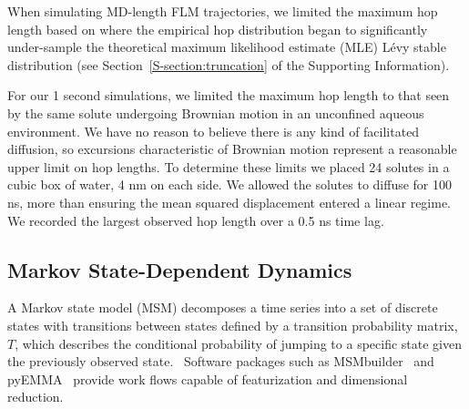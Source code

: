 \documentclass{article}
\begin{document}


  When simulating MD-length FLM trajectories, we limited the maximum hop length based on where
  the empirical hop distribution began to significantly under-sample the theoretical
  maximum likelihood estimate (MLE) L\'evy stable distribution (see 
  Section~\ref{S-section:truncation} of the Supporting Information).

  For our 1 second simulations, we limited the maximum hop length to that seen by
  the same solute undergoing Brownian motion in an unconfined aqueous environment. 
  We have no reason to believe there is any kind of facilitated diffusion, so 
  excursions characteristic of Brownian motion represent a reasonable upper limit
  on hop lengths. To determine these limits we placed 24 solutes in a cubic box of 
  water, 4 nm on each side. We allowed the solutes to diffuse for 100 ns, more than
  ensuring the mean squared displacement entered a linear regime. We recorded the largest
  observed hop length over a 0.5 ns time lag. 

  \subsection{Markov State-Dependent Dynamics}\label{method:MSMs}  

  A Markov state model (MSM) decomposes a time series into a set of discrete states
  with transitions between states defined by a transition probability matrix, $T$,
  which describes the conditional probability of jumping to a specific state given
  the previously observed state.~\cite{pande_everything_2010,wehmeyer_introduction_2018}
  Software packages such as MSMbuilder~\cite{beauchamp_msmbuilder2:_2011} and 
  pyEMMA~\cite{scherer_pyemma_2015} provide work flows capable of featurization and
  dimensional reduction.
\end{document}
